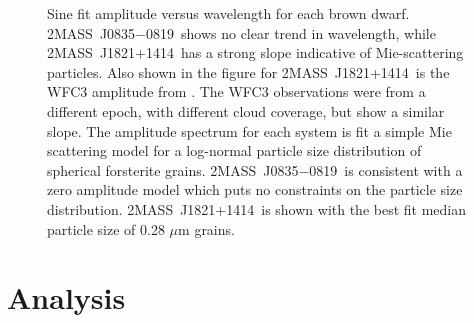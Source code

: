 \documentclass[twocolumn]{aastex6}
\newcommand{\sha}{2MASS~J0835$-$0819}
\newcommand{\shb}{2MASS~J1821+1414}
\begin{document}
\begin{figure}
\centering
{}
	\caption{Sine fit amplitude versus wavelength for each brown dwarf. \sha\ shows no clear trend in wavelength, while \shb\ has a strong slope indicative of Mie-scattering particles.
	 Also shown in the figure for \shb\ is the WFC3 amplitude from \citet{2015ApJ...798L..13Y}. The WFC3 observations were from a different epoch, with different cloud coverage, but show a similar slope.
	 The amplitude spectrum for each system is fit a simple Mie scattering model for a log-normal particle size distribution of spherical forsterite grains.
	 \sha\ is consistent with a zero amplitude model which puts no constraints on the particle size distribution.
	 \shb\ is shown with the best fit median particle size of 0.28 $\mu$m grains.}
	\label{fig:ampSpec}
\end{figure} 

\section{Analysis}\label{sec:analysis}
\end{document}

